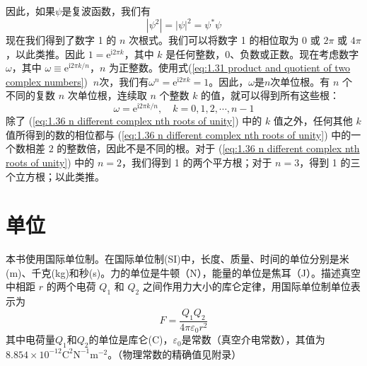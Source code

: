 	因此，如果$\psi$是复波函数，我们有
	\begin{equation}
		\left|\psi^2\right| = \left|\psi\right|^2 = \psi^{\ast} \psi
		\label{eq:1.35 properties of psi wave function}
	\end{equation}
	\indent 现在我们得到了数字 1 的 $n$ 次根式。我们可以将数字 1 的相位取为 0 或 $2\pi$ 或 $4\pi$，以此类推。因此 $1 = \mathrm{e}^{\mathrm{i}2\pi k}$，其中 $k$ 是任何整数，0、负数或正数。现在考虑数字 $\omega$，其中 $\omega \equiv \mathrm{e}^{\mathrm{i} 2\pi k /n}$，$n$ 为正整数。使用式(\ref{eq:1.31 product and quotient of two complex numbers}) $\:$$n$次，我们有$\omega^n = \mathrm{e}^{\mathrm{i}2\pi k} = 1$。因此，$\omega$是$n$次单位根。有 $n$ 个不同的复数 $n$ 次单位根，连续取 $n$ 个整数 $k$ 的值，就可以得到所有这些根：
	\begin{equation}
		\omega = \mathrm{e}^{\mathrm{i} 2\pi k /n}, \quad k = 0,1,2,\cdots , n-1
		\label{eq:1.36 n different complex nth roots of unity}
	\end{equation}
	除了 (\ref{eq:1.36 n different complex nth roots of unity}) 中的 $k$ 值之外，任何其他 $k$ 值所得到的数的相位都与 (\ref{eq:1.36 n different complex nth roots of unity}) 中的一个数相差 $2$ 的整数倍，因此不是不同的根。对于 (\ref{eq:1.36 n different complex nth roots of unity}) 中的 $n=2$，我们得到 1 的两个平方根；对于 $n=3$，得到 1 的三个立方根；以此类推。
	
	\section{单位}
	本书使用国际单位制。在国际单位制(SI)中，长度、质量、时间的单位分别是米(m)、千克(kg)和秒(s)。力的单位是牛顿（N），能量的单位是焦耳（J）。描述真空中相距 $r$ 的两个电荷 $Q_1$ 和 $Q_2$ 之间作用力大小的库仑定律，用国际单位制单位表示为
	\begin{equation}
		\boxed{F = \frac{Q_1Q_2}{4\pi \varepsilon_0r^2}}
		\label{eq:1.37 coulomb's law}
	\end{equation}
	其中电荷量$Q_1$和$Q_2$的单位是库仑(C)，$\varepsilon_0$是常数（真空介电常数），其值为$8.854 \times 10^{-12} \mathrm{C}^2\mathrm{N}^{-1}\mathrm{m}^{-2}$。（物理常数的精确值见附录）
	
